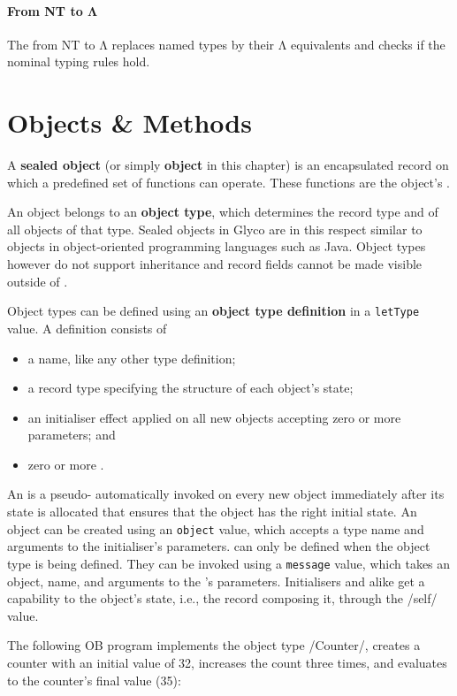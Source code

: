 \documentclass[main.tex]{subfiles}
\begin{document}
\paragraph{From NT to Λ} The  from NT to Λ replaces named types by their Λ equivalents and checks if the nominal typing rules hold.

\section{Objects \& Methods} \label{sct:obj-meth}
A \textbf{sealed object} (or simply \textbf{object} in this chapter) is an encapsulated record on which a predefined set of functions can operate. These functions are the object's \textbf{}.

An object belongs to an \textbf{object type}, which determines the record type and  of all objects of that type. Sealed objects in Glyco are in this respect similar to objects in object-oriented programming languages such as Java. Object types however do not support inheritance and record fields cannot be made visible outside of .

Object types can be defined using an \textbf{object type definition} in a \texttt{letType} value. A definition consists of
\begin{itemize}[nosep]
	\item a name, like any other type definition;
	\item a record type specifying the structure of each object's state;
	\item an initialiser effect applied on all new objects accepting zero or more parameters; and
	\item zero or more .
\end{itemize}

An \textbf{} is a pseudo- automatically invoked on every new object immediately after its state is allocated that ensures that the object has the right initial state. An object can be created using an \texttt{object} value, which accepts a type name and arguments to the initialiser's parameters.  can only be defined when the object type is being defined. They can be invoked using a \texttt{message} value, which takes an object,  name, and arguments to the 's parameters. Initialisers and  alike get a capability to the object's state, i.e., the record composing it, through the \iil/self/ value.

The following OB program implements the object type \iil/Counter/, creates a counter with an initial value of 32, increases the count three times, and evaluates to the counter's final value (35):
\end{document}
